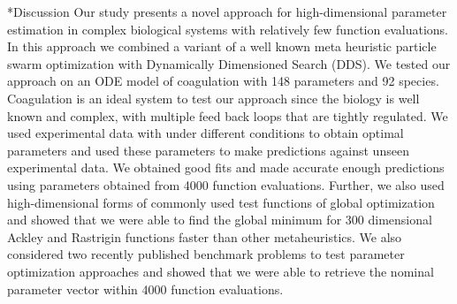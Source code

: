 \documentclass[12pt]{article}
\makeatletter
\renewcommand\section{\@startsection
	{subsection}{2}{0mm}
	{-0.2in}
	{0.05\baselineskip}
	{\normalfont\large\bfseries}}
\makeatother
\begin{document}
\clearpage
\section*{Discussion}
Our study presents a novel approach for high-dimensional parameter estimation in complex biological systems with relatively few function evaluations. In this approach we combined a variant of a well known meta heuristic particle swarm optimization with Dynamically Dimensioned Search (DDS). We tested our approach on an ODE model of coagulation with 148 parameters and 92 species. Coagulation is an ideal system to test our approach since the biology is well known and complex, with multiple feed back loops that are tightly regulated. We used experimental data with under different conditions to obtain optimal parameters and used these parameters to make predictions against unseen experimental data. We obtained good fits and made accurate enough predictions using parameters obtained from 4000 function evaluations. Further, we also used high-dimensional forms of commonly used test functions of global optimization and showed that we were able to find the global minimum for 300 dimensional Ackley and Rastrigin functions faster than other metaheuristics. We also considered two recently published benchmark problems to test parameter optimization approaches and showed that we were able to retrieve the nominal parameter vector within 4000 function evaluations.
\end{document}
